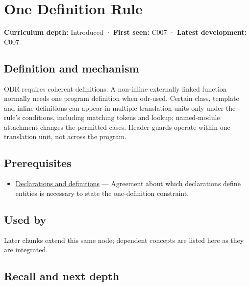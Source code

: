 \hypertarget{appendix-49d27bc9d9a5}{}\label{referencestart:appendix-49d27bc9d9a5}
\section{One Definition Rule}\label{appendix-49d27bc9d9a5-one-definition-rule}

\textbf{Curriculum depth:} Introduced · \textbf{First seen:} C007 · \textbf{Latest development:} C007

\begin{allmightroledefinition}

\subsection{Definition and mechanism}\label{appendix-49d27bc9d9a5-definition-and-mechanism}

ODR requires coherent definitions. A non-inline externally linked function normally needs one program definition when odr-used. Certain class, template and inline definitions can appear in multiple translation units only under the rule's conditions, including matching tokens and lookup; named-module attachment changes the permitted cases. Header guards operate within one translation unit, not across the program.

\end{allmightroledefinition}

\subsection{Prerequisites}\label{appendix-49d27bc9d9a5-prerequisites}

\begin{itemize}
\tightlist
\item
  \hyperref[appendix-2e4d494c2d94]{Declarations and definitions} --- Agreement about which declarations define entities is necessary to state the one-definition constraint.
\end{itemize}

\subsection{Used by}\label{appendix-49d27bc9d9a5-used-by}

Later chunks extend this same node; dependent concepts are listed here as they are integrated.

\subsection{Recall and next depth}\label{appendix-49d27bc9d9a5-recall-and-next-depth}

